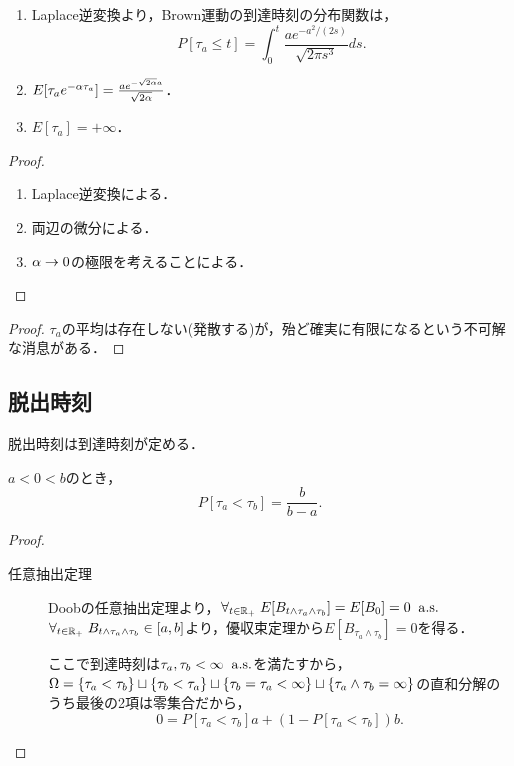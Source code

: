 \documentclass[uplatex,dvipdfmx]{jsreport}
\begin{document}
\begin{corollary}[到達時刻の分布]\mbox{}
    \begin{enumerate}
        \item Laplace逆変換より，Brown運動の到達時刻の分布関数は，
        \[P[\tau_a\le t]=\int^t_0\frac{ae^{-a^2/(2s)}}{\sqrt{2\pi s^3}}ds.\]
        \item $E[\tau_ae^{-\alpha\tau_a}]=\frac{ae^{-\sqrt{2\alpha}a}}{\sqrt{2\alpha}}$．
        \item $E[\tau_a]=+\infty$．
    \end{enumerate}
\end{corollary}
\begin{proof}\mbox{}
    \begin{enumerate}
        \item Laplace逆変換による．
        \item 両辺の微分による．
        \item $\alpha\to0$の極限を考えることによる．
    \end{enumerate}
\end{proof}
\begin{proof}
    $\tau_a$の平均は存在しない(発散する)が，殆ど確実に有限になるという不可解な消息がある．
\end{proof}

\subsection{脱出時刻}

\begin{tcolorbox}[colframe=ForestGreen, colback=ForestGreen!10!white,breakable,colbacktitle=ForestGreen!40!white,coltitle=black,fonttitle=\bfseries\sffamily,
title=]
    脱出時刻は到達時刻が定める．
\end{tcolorbox}

\begin{proposition}[どっちの端から脱出するかの確率]
    $a<0<b$のとき，
    \[P[\tau_a<\tau_b]=\frac{b}{b-a}.\]
\end{proposition}
\begin{proof}\mbox{}
    \begin{description}
        \item[任意抽出定理] Doobの任意抽出定理より，$\forall_{t\in\mathbb{R}_+}\;E[B_{t\land\tau_a\land\tau_b}]=E[B_0]=0\;\;\mathrm{a.s.}$
        $\forall_{t\in\mathbb{R}_+}\;B_{t\land\tau_a\land\tau_b}\in[a,b]$より，優収束定理から$E[B_{\tau_a\land\tau_b}]=0$を得る．

        ここで到達時刻は$\tau_a,\tau_b<\infty\;\;\mathrm{a.s.}$を満たすから，$\Omega=\left\{\tau_a<\tau_b\right\}\sqcup\left\{\tau_b<\tau_a\right\}\sqcup\left\{\tau_b=\tau_a<\infty\right\}\sqcup\left\{\tau_a\land\tau_b=\infty\right\}$の直和分解のうち最後の2項は零集合だから，
        \[0=P[\tau_a<\tau_b]a+(1-P[\tau_a<\tau_b])b.\]
    \end{description}
\end{proof}
\end{document}

